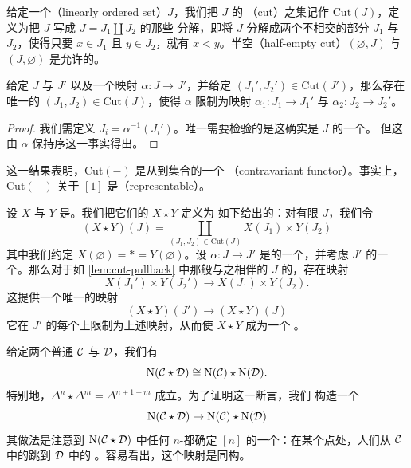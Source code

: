\begin{definition}\label{def:cuts}
给定一个\trLinearlyOrderedSet{}（linearly ordered set）$J$，我们把 $J$ 的\emph{\trCut{}}%
（cut）之集记作 $\mathrm{Cut}(J)$，定义为把 $J$ 写成 $J = J_1 \amalg J_2$ 的那些
分解，即将 $J$ 分解成两个不相交的部分 $J_1$ 与 $J_2$，使得只要 $x \in J_1$ 且
$y \in J_2$，就有 $x < y$。半空\trCut{}（half-empty cut）$(\varnothing, J)$ 与
$(J, \varnothing)$ 是允许的。
\end{definition}

\begin{lemma}\label{lem:cut-pullback}
给定\trLinearlyOrderedSet{} $J$ 与 $J'$ 以及一个映射 $\alpha\colon J \to J'$，并给定
$(J_1', J_2') \in \mathrm{Cut}(J')$，那么存在唯一的\trCut{}%
$(J_1, J_2) \in \mathrm{Cut}(J)$，使得 $\alpha$ 限制为映射
$\alpha_1\colon J_1 \to J_1'$ 与 $\alpha_2\colon J_2 \to J_2'$。
\end{lemma}

\begin{proof}
我们需定义 $J_i = \alpha^{-1}(J_i')$。唯一需要检验的是这确实是 $J$ 的一个\trCut{}。
但这由 $\alpha$ 保持序这一事实得出。
\end{proof}

\begin{observation}\label{obs:cut-representable}
这一结果表明，$\mathrm{Cut}(-)$ 是从\trLinearlyOrderedSet{}到集合的一个%
\trContravariantFunctor{}（contravariant functor）。事实上，$\mathrm{Cut}(-)$
关于 $[1]$ 是\trRepresentable{}（representable）。
\end{observation}

\begin{definition}\label{def:join-simplicial-sets}
设 $X$ 与 $Y$ 是\trSimplicialSets{}。我们把它们的\trJoin{} $X \star Y$ 定义为
如下给出的\trSimplicialSet{}：对有限\trLinearlyOrderedSet{} $J$，我们令
\[
(X \star Y)(J) =
\coprod_{(J_1, J_2) \in \mathrm{Cut}(J)} X(J_1) \times Y(J_2)
\]
其中我们约定 $X(\varnothing) = \ast = Y(\varnothing)$。设 $\alpha\colon J \to J'$
是\trLinearlyOrderedSet{}的一个\trMorphism{}，并考虑 $J'$ 的一个\trCut{}。那么对于如%
\cref{lem:cut-pullback} 中那般与之相伴的 $J$ 的\trCut{}，存在映射
\[
X(J_1') \times Y(J_2') \to X(J_1) \times Y(J_2).
\]
这提供一个唯一的映射
\[
(X \star Y)(J') \to (X \star Y)(J)
\]
它在 $J'$ 的每个\trCut{}上限制为上述映射，从而使 $X \star Y$ 成为一个%
\trSimplicialSet{}。
\end{definition}

\begin{example*}
给定两个普通\trCategories{} $\mathcal{C}$ 与 $\mathcal{D}$，我们有
\[
\mathrm{N}(\mathcal{C} \star \mathcal{D}) \cong \mathrm{N}(\mathcal{C}) \star \mathrm{N}(\mathcal{D}).
\]
特别地，$\Delta^n \star \Delta^m = \Delta^{n+1+m}$ 成立。为了证明这一断言，我们
构造一个\trSimplicialMap{}%
\[
\mathrm{N}(\mathcal{C} \star \mathcal{D}) \to \mathrm{N}(\mathcal{C}) \star \mathrm{N}(\mathcal{D})
\]
其做法是注意到 $\mathrm{N}(\mathcal{C} \star \mathcal{D})$ 中任何 $n$-\trSimplex{}都确定
$[n]$ 的一个\trCut{}：在某个点处，人们从 $\mathcal{C}$ 中的\trMorphism{}跳到 $\mathcal{D}$ 中的%
\trMorphism{}。容易看出，这个映射是同构。
\end{example*}

